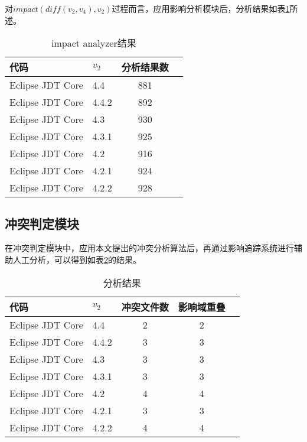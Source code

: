 对$impact(diff(v_2,v_4),v_2)$过程而言，应用影响分析模块后，分析结果如表\ref {data_impact_2}所述。

\begin{table}[H]
	\caption{impact analyzer结果}
	\label{data_impact_2}
	\centering
	\begin{tabular}{llcc}
		\toprule[1.5pt]
		{\heiti 代码} & {\heiti $v_2$} & {\heiti 分析结果数}  \\\midrule[1pt]
		Eclipse JDT Core & 4.4	 & 881	\\
		Eclipse JDT Core & 4.4.2 & 892	 	\\
		Eclipse JDT Core & 4.3	 & 930			\\
		Eclipse JDT Core & 4.3.1 & 925	 	\\
		Eclipse JDT Core & 4.2 	 & 916			\\
		Eclipse JDT Core & 4.2.1 	 & 924		\\
		Eclipse JDT Core & 4.2.2 	 & 928		\\
		\bottomrule[1.5pt]
	\end{tabular}
\end{table}


\subsection{冲突判定模块}

在冲突判定模块中，应用本文提出的冲突分析算法后，再通过影响追踪系统进行辅助人工分析，可以得到如表\ref {data_compatible}的结果。

\begin{table}[H]
	\caption{分析结果}
	\label{data_compatible}
	\centering
	\begin{tabular}{llccc}
		\toprule[1.5pt]
		{\heiti 代码} & {\heiti $v_2$} & {\heiti 冲突文件数} & {\heiti 影响域重叠}  \\\midrule[1pt]
		Eclipse JDT Core & 4.4 	& 2 & 2 \\
		Eclipse JDT Core & 4.4.2 & 3 & 3 \\
		Eclipse JDT Core & 4.3 	& 3 & 3 \\
		Eclipse JDT Core & 4.3.1 & 3 & 3 \\
		Eclipse JDT Core & 4.2 	& 4 & 4 \\
		Eclipse JDT Core & 4.2.1 & 3  &	3 \\
		Eclipse JDT Core & 4.2.2 & 4 & 4 \\
		\bottomrule[1.5pt]
	\end{tabular}
\end{table}

